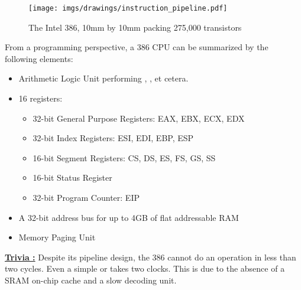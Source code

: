 \documentclass[book.tex]{subfiles}
\begin{document}
\begin{figure}[H]
\centering
\texttt{[image: imgs/drawings/instruction\_pipeline.pdf]}\\
\end{figure}
\par
\begin{figure}[H]
\centering

\caption{The Intel 386, 10mm by 10mm packing 275,000 transistors}
\end{figure}
\par
From a programming perspective, a 386 CPU can be summarized by the following elements:
\begin{itemize}
\item Arithmetic Logic Unit performing , ,  et cetera.
\item 16 registers:
\begin{itemize}
  \item 32-bit General Purpose Registers: EAX, EBX, ECX, EDX
  \item 32-bit Index Registers: ESI, EDI, EBP, ESP
  \item 16-bit Segment Registers: CS, DS, ES, FS, GS, SS
  \item 16-bit Status Register
  \item 32-bit Program Counter: EIP
\end{itemize}
\item A 32-bit address bus for up to 4GB of flat addressable RAM
\item Memory Paging Unit
\end{itemize}
 \par
 \textbf{\underline{Trivia :}} Despite its pipeline design, the 386 cannot do an operation in less than two cycles. Even a simple  or  takes two clocks. This is due to the absence of a SRAM on-chip cache and a slow decoding unit.\\
 \par
 
\end{document}
